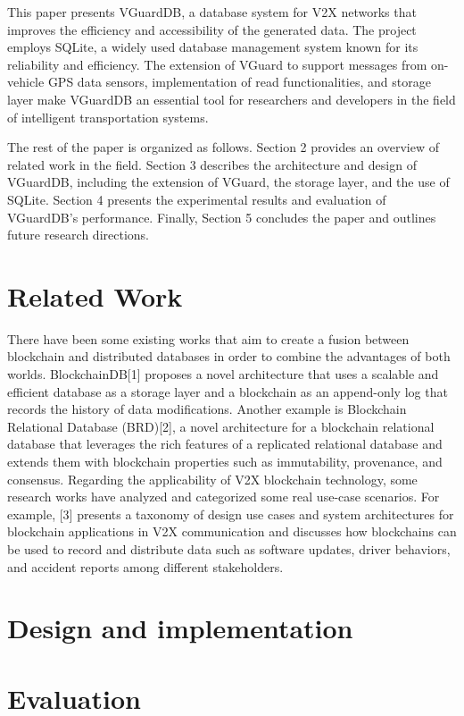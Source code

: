 This paper presents VGuardDB, a database system for V2X networks that improves the efficiency and accessibility of the generated data. The project employs SQLite, a widely used database management system known for its reliability and efficiency. The extension of VGuard to support messages from on-vehicle GPS data sensors, implementation of read functionalities, and storage layer make VGuardDB an essential tool for researchers and developers in the field of intelligent transportation systems.

The rest of the paper is organized as follows. Section 2 provides an overview of related work in the field. Section 3 describes the architecture and design of VGuardDB, including the extension of VGuard, the storage layer, and the use of SQLite. Section 4 presents the experimental results and evaluation of VGuardDB's performance. Finally, Section 5 concludes the paper and outlines future research directions.
\section{Related Work}
There have been some existing works that aim to create a fusion between blockchain and distributed databases in order to combine the advantages of both worlds. BlockchainDB[1] proposes a novel architecture that uses a scalable and efficient database as a storage layer and a blockchain as an append-only log that records the history of data modifications. Another example is Blockchain Relational Database (BRD)[2], a novel architecture for a blockchain relational database that leverages the rich features of a replicated relational database and extends them with blockchain properties such as immutability, provenance, and consensus.
Regarding the applicability of V2X blockchain technology, some research works have analyzed and categorized some real use-case scenarios. For example,  [3] presents a taxonomy of design use cases and system architectures for blockchain applications in V2X communication and discusses how blockchains can be used to record and distribute data such as software updates, driver behaviors, and accident reports among different stakeholders. 

\section{Design and implementation}
\section{Evaluation}


